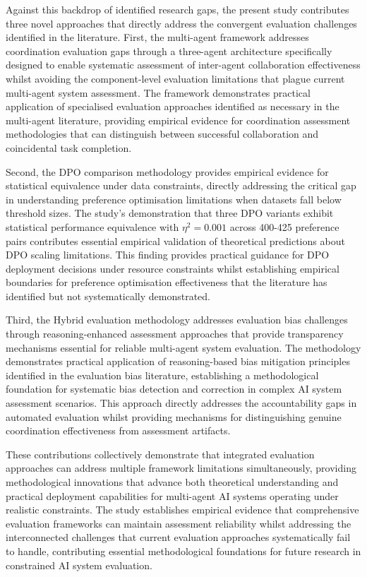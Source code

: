 Against this backdrop of identified research gaps, the present study contributes three novel approaches that directly address the convergent evaluation challenges identified in the literature. First, the multi-agent framework addresses coordination evaluation gaps through a three-agent architecture specifically designed to enable systematic assessment of inter-agent collaboration effectiveness whilst avoiding the component-level evaluation limitations that plague current multi-agent system assessment. The framework demonstrates practical application of specialised evaluation approaches identified as necessary in the multi-agent literature, providing empirical evidence for coordination assessment methodologies that can distinguish between successful collaboration and coincidental task completion.

Second, the DPO comparison methodology provides empirical evidence for statistical equivalence under data constraints, directly addressing the critical gap in understanding preference optimisation limitations when datasets fall below threshold sizes. The study's demonstration that three DPO variants exhibit statistical performance equivalence with $\eta^2 = 0.001$ across 400-425 preference pairs contributes essential empirical validation of theoretical predictions about DPO scaling limitations. This finding provides practical guidance for DPO deployment decisions under resource constraints whilst establishing empirical boundaries for preference optimisation effectiveness that the literature has identified but not systematically demonstrated.

Third, the Hybrid evaluation methodology addresses evaluation bias challenges through reasoning-enhanced assessment approaches that provide transparency mechanisms essential for reliable multi-agent system evaluation. The methodology demonstrates practical application of reasoning-based bias mitigation principles identified in the evaluation bias literature, establishing a methodological foundation for systematic bias detection and correction in complex AI system assessment scenarios. This approach directly addresses the accountability gaps in automated evaluation whilst providing mechanisms for distinguishing genuine coordination effectiveness from assessment artifacts.

These contributions collectively demonstrate that integrated evaluation approaches can address multiple framework limitations simultaneously, providing methodological innovations that advance both theoretical understanding and practical deployment capabilities for multi-agent AI systems operating under realistic constraints. The study establishes empirical evidence that comprehensive evaluation frameworks can maintain assessment reliability whilst addressing the interconnected challenges that current evaluation approaches systematically fail to handle, contributing essential methodological foundations for future research in constrained AI system evaluation.
